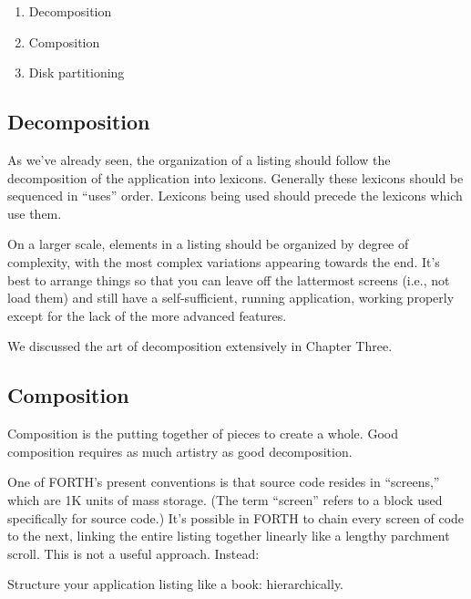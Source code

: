 \begin{enumerate}
\item Decomposition
\item Composition
\item Disk partitioning
\end{enumerate}
\subsection{Decomposition}

As we've already seen, the organization of a listing should follow the
decomposition of the application into lexicons.  Generally these lexicons
should be sequenced in ``uses'' order.  Lexicons being used should precede
the lexicons which use them.

On a larger scale, elements in a listing should be organized by
degree of complexity, with the most complex variations appearing
towards the end.  It's best to arrange things so that you can leave off the
lattermost screens (i.e., not load them) and still have a self-sufficient,
running application, working properly except for the lack of the more advanced
features.

We discussed the art of decomposition extensively in Chapter Three.

\subsection{Composition}

Composition is the putting together of pieces to create a whole.  Good
composition requires as much artistry as good decomposition.

One of FORTH's present conventions is that source code resides in
``screens,'' which are 1K units of mass storage.  (The term ``screen'' refers
to a block used specifically for source code.) It's possible in FORTH to
chain every screen of code to the next, linking the entire listing together
linearly like a lengthy parchment scroll.  This is not a useful approach.
Instead:

\begin{tip}
Structure your application listing like a book: hierarchically.
\end{tip}

